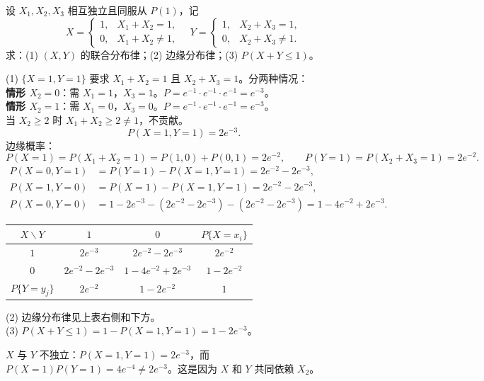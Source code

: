 ﻿\documentclass[lang=cn,11pt]{elegantbook}
\begin{document}
\begin{exercise}[泊松变量的复合函数] \label{exer:3-d4}
设 $X_1,X_2,X_3$ 相互独立且同服从 $P(1)$，记
\[
X = \begin{cases} 1, & X_1+X_2=1, \\ 0, & X_1+X_2\neq 1, \end{cases} \quad Y = \begin{cases} 1, & X_2+X_3=1, \\ 0, & X_2+X_3\neq 1. \end{cases}
\]
求：(1) $(X,Y)$ 的联合分布律；(2) 边缘分布律；(3) $P(X+Y \leqslant 1)$。
\end{exercise}
\begin{solution}
(1) $\{X=1,Y=1\}$ 要求 $X_1+X_2=1$ 且 $X_2+X_3=1$。分两种情况：\\
\textbf{情形 $X_2=0$}：需 $X_1=1$，$X_3=1$。$P = e^{-1}\cdot e^{-1}\cdot e^{-1} = e^{-3}$。\\
\textbf{情形 $X_2=1$}：需 $X_1=0$，$X_3=0$。$P = e^{-1}\cdot e^{-1}\cdot e^{-1} = e^{-3}$。\\
当 $X_2 \geqslant 2$ 时 $X_1+X_2 \geqslant 2 \neq 1$，不贡献。
\[
P(X=1,Y=1) = 2e^{-3}.
\]
边缘概率：
\[
P(X=1) = P(X_1+X_2=1) = P(1,0)+P(0,1) = 2e^{-2}, \qquad P(Y=1) = P(X_2+X_3=1) = 2e^{-2}.
\]
\begin{align*}
P(X=0,Y=1) &= P(Y=1)-P(X=1,Y=1) = 2e^{-2}-2e^{-3}, \\
P(X=1,Y=0) &= P(X=1)-P(X=1,Y=1) = 2e^{-2}-2e^{-3}, \\
P(X=0,Y=0) &= 1-2e^{-3}-(2e^{-2}-2e^{-3})-(2e^{-2}-2e^{-3}) = 1-4e^{-2}+2e^{-3}.
\end{align*}
\begin{center}
\begin{tabular}{c|cc|c}
\toprule
$X \backslash Y$ & $1$ & $0$ & $P\{X=x_i\}$ \\
\midrule
$1$ & $2e^{-3}$ & $2e^{-2}-2e^{-3}$ & $2e^{-2}$ \\[4pt]
$0$ & $2e^{-2}-2e^{-3}$ & $1-4e^{-2}+2e^{-3}$ & $1-2e^{-2}$ \\
\midrule
$P\{Y=y_j\}$ & $2e^{-2}$ & $1-2e^{-2}$ & $1$ \\
\bottomrule
\end{tabular}
\end{center}
(2) 边缘分布律见上表右侧和下方。\\
(3) $P(X+Y \leqslant 1) = 1-P(X=1,Y=1) = 1-2e^{-3}$。
\begin{note}
$X$ 与 $Y$ 不独立：$P(X=1,Y=1)=2e^{-3}$，而 $P(X=1)P(Y=1)=4e^{-4} \neq 2e^{-3}$。这是因为 $X$ 和 $Y$ 共同依赖 $X_2$。
\end{note}
\end{solution}
\end{document}
